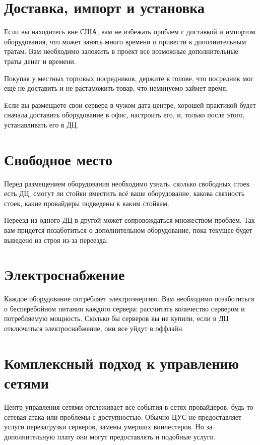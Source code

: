 \section{ Доставка, импорт и установка } \label{sect2_13}

Если вы находитесь вне США, вам не избежать проблем с доставкой и импортом оборудования, что может занять много времени и привести к дополнительным тратам. Вам необходимо заложить в проект все возможные дополнительные траты денег и времени.

Покупая у местных торговых посредников, держите в голове, что посредник мог ещё не доставить и не растаможить товар, что неминуемо займет время.

Если вы размещаете свои сервера в чужом дата-центре, хорошей практикой будет сначала доставить оборудование в офис, настроить его, и, только после этого, устанавливать его в ДЦ.

\section{ Свободное место } \label{sect2_14}

Перед размещением оборудования необходимо узнать, сколько свободных стоек есть ДЦ, смогут ли стойки вместить всё ваше оборудование, какова связность стоек, какие провайдеры подведены к каким стойкам.

Переезд из одного ДЦ в другой может сопровождаться множеством проблем. Так вам придется позаботиться о дополнительном оборудование, пока текущее будет выведено из строя из-за переезда.

\section{ Электроснабжение } \label{sect2_15}

Каждое оборудование потребляет электроэнергию. Вам необходимо позаботиться о бесперебойном питании каждого сервера: рассчитать количество сервером и потребляемую мощность. Сколько бы серверов вы не купили, если в ДЦ отключиться электроснабжение, они все уйдут в оффлайн.

\section{ Комплексный подход к управлению сетями } \label{sect2_16}

Центр управления сетями отслеживает все события в сетях провайдеров: будь-то сетевая атака или проблемы с доступностью. Обычно ЦУС не предоставляет услуги  перезагрузки серверов, замены умерших винчестеров. Но за дополнительную плату они могут предоставлять и подобные услуги.

